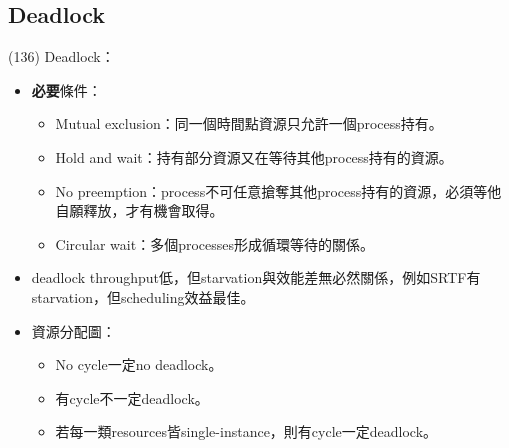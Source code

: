 \subsection{Deadlock}

\begin{theorem}{(136)} Deadlock：\begin{itemize}
        \item \textbf{必要}條件：\begin{itemize}
            \item Mutual exclusion：同一個時間點資源只允許一個process持有。
            \item Hold and wait：持有部分資源又在等待其他process持有的資源。
            \item No preemption：process不可任意搶奪其他process持有的資源，必須等他自願釋放，才有機會取得。
            \item Circular wait：多個processes形成循環等待的關係。
        \end{itemize}
        \item deadlock throughput低，但starvation與效能差無必然關係，例如SRTF有starvation，但scheduling效益最佳。
        \item 資源分配圖：\begin{itemize}
            \item No cycle一定no deadlock。
            \item 有cycle不一定deadlock。
            \item 若每一類resources皆single-instance，則有cycle一定deadlock。
        \end{itemize}
    \end{itemize}
\end{theorem}

